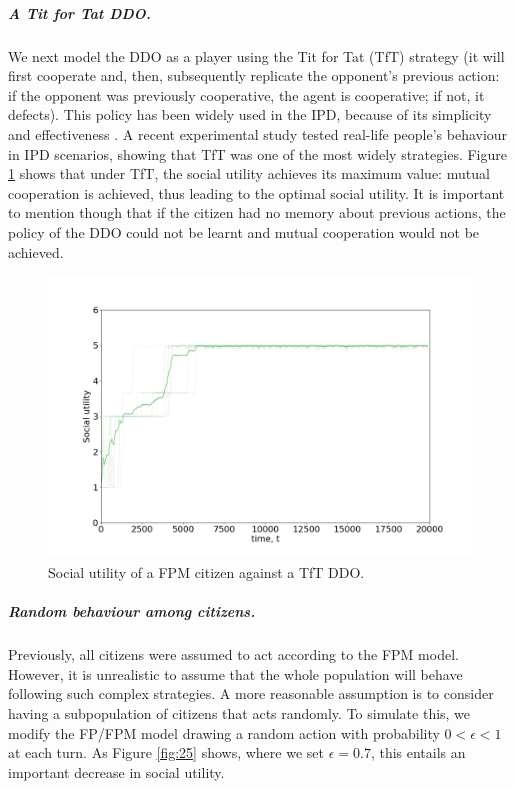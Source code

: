 \subparagraph{A Tit for Tat DDO.}
We next model the DDO as a player using the Tit for Tat (TfT) strategy
(it will first cooperate and, then, subsequently replicate the opponent's previous action: if the opponent was previously cooperative, the agent is cooperative; if not, it defects).
This policy has been widely used in the IPD, because of its simplicity and effectiveness \parencite{axelrod84}. A recent experimental study 
\parencite{dal2019strategy}
 tested real-life people's behaviour in IPD scenarios,
 showing that TfT was one of the most widely strategies.
 Figure \ref{fig:FPMvsTfT} shows that under TfT, the 
 social utility achieves its maximum value: mutual cooperation is achieved, thus leading to the optimal social utility.
It is important to mention though that 
if the citizen had no memory about previous actions, the policy of the DDO could not be learnt and mutual cooperation would not be achieved.

\begin{figure}[h!]
\centering
\includegraphics[width=0.6\linewidth]{img/tft.png}%
\caption{Social utility of a FPM citizen against a TfT DDO.}\label{fig:FPMvsTfT}
\end{figure}



\subparagraph{Random behaviour among citizens.}
 Previously,  all citizens were assumed to
 act according to the FPM model.
 However, 
 it is unrealistic to assume
 that the whole population will behave following such complex strategies. A more reasonable
 assumption is to consider having a  subpopulation of citizens that acts randomly. To simulate this, we modify the FP/FPM model drawing a random action with probability $0 < \epsilon < 1$ at each turn. As Figure \ref{fig:25} shows, where we set $\epsilon = 0.7$, this entails an important decrease in social utility. 

